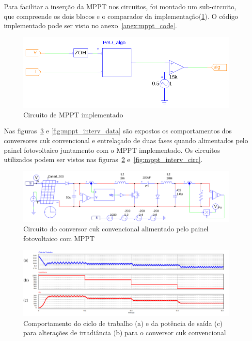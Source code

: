 \documentclass[
	12pt,				%
	openright,			%
	twoside,			%
	a4paper,			%
	english,			%
	french,				%
	spanish,			%
	brazil,				%
	]{abntex2}
\begin{document}
Para facilitar a inserção da MPPT nos circuitos, foi montado um sub-circuito, que compreende os dois blocos e o comparador da implementação(\ref{fig:mppt_subcircuit}). O código implementado pode ser visto no anexo~\ref{anex:mppt_code}.

\begin{figure}[htb]%
	\begin{center}%
		\includegraphics[width=0.85 \linewidth]{mppt_psim_circ}
		\caption{Circuito de MPPT implementado}
		\label{fig:mppt_subcircuit}
	\end{center}
\end{figure}

Nas figuras~\ref{fig:mppt_conv_data} e \ref{fig:mppt_interv_data} são expostos os comportamentos dos conversores cuk convencional e entrelaçado de duas fases quando alimentados pelo painel fotovoltaico juntamento com o MPPT implementado. Os circuitos utilizados podem ser vistos nas figuras~\ref{fig:mppt_conv_circ} e~\ref{fig:mppt_interv_circ}.

\begin{figure}[htb]%
	\captionsetup{justification=centering}%
	\begin{center}%
		\includegraphics[width= \linewidth]{mppt_conv_circ}
		\caption{Circuito do conversor cuk convencional alimentado pelo painel fotovoltaico com MPPT}
		\label{fig:mppt_conv_circ}
	\end{center}
\end{figure}

\begin{figure}[htb]%
	\captionsetup{justification=centering}%
	\begin{center}%
		\includegraphics[width= \textwidth]{mppt_conv_data}
		\caption{Comportamento do ciclo de trabalho (a) e da potência de saída (c) para alterações de irradiância (b) para o conversor cuk convencional}
		\label{fig:mppt_conv_data}
	\end{center}
\end{figure}
\end{document}
